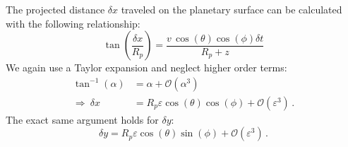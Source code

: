 The projected distance $\delta x$ traveled on the planetary surface can be calculated with the following relationship:
\begin{equation*}
    \tan\left(\frac{\delta x}{R_p}\right) = \frac{v\,\cos(\theta)\cos(\phi)\delta t}{R_p + z}
\end{equation*}
We again use a Taylor expansion and neglect higher order terms:
\begin{align}
    \tan^{-1}(\alpha) &= \alpha + \mathcal{O}(\alpha^3) \nonumber\\
    \Rightarrow\ \delta x &= R_p \varepsilon \cos(\theta)\cos(\phi) + \mathcal{O}(\varepsilon^3)\,.
\end{align}
The exact same argument holds for $\delta y$:
\begin{equation}
    \delta y = R_p \varepsilon \cos(\theta)\sin(\phi) + \mathcal{O}(\varepsilon^3)\,.
\end{equation}


